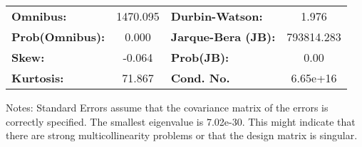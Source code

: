 \begin{center}
\begin{tabular}{lcccccc}
\bottomrule
\end{tabular}
\begin{tabular}{lclc}
\textbf{Omnibus:}       & 1470.095 & \textbf{  Durbin-Watson:     } &     1.976   \\
\textbf{Prob(Omnibus):} &   0.000  & \textbf{  Jarque-Bera (JB):  } & 793814.283  \\
\textbf{Skew:}          &  -0.064  & \textbf{  Prob(JB):          } &      0.00   \\
\textbf{Kurtosis:}      &  71.867  & \textbf{  Cond. No.          } &  6.65e+16   \\
\bottomrule
\end{tabular}
\end{center}

Notes: \newline
 [1] Standard Errors assume that the covariance matrix of the errors is correctly specified. \newline
 [2] The smallest eigenvalue is 7.02e-30. This might indicate that there are \newline
 strong multicollinearity problems or that the design matrix is singular.